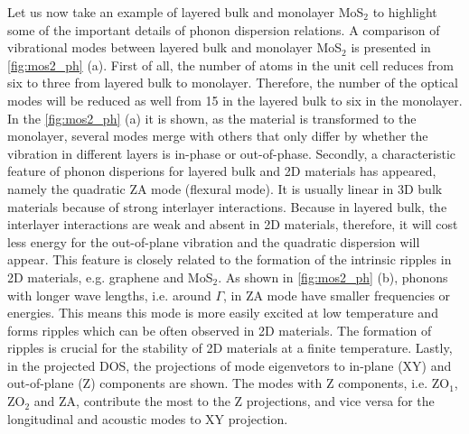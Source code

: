 Let us now take an example of layered bulk and monolayer MoS$_2$ to highlight some of the important details of phonon dispersion relations. A comparison of vibrational modes between layered bulk and monolayer MoS$_2$ is presented in \autoref{fig:mos2_ph} (a). First of all, the number of atoms in the unit cell reduces from six to three from layered bulk to monolayer. Therefore, the number of the optical modes will be reduced as well from 15 in the layered bulk to six in the monolayer. In the \autoref{fig:mos2_ph} (a) it is shown, as the material is transformed to the monolayer, several modes merge with others that only differ by whether the vibration in different layers is in-phase or out-of-phase. Secondly, a characteristic feature of phonon disperions for layered bulk and 2D materials has appeared, namely the quadratic ZA mode (flexural mode). It is usually linear in 3D bulk materials because of strong interlayer interactions. Because in layered bulk, the interlayer interactions are weak and absent in 2D materials, therefore, it will cost less energy for the out-of-plane vibration and the quadratic dispersion will appear\cite{kittel}. This feature is closely related to the formation of the intrinsic ripples in 2D materials, e.g. graphene\cite{neek} and MoS$_2$\cite{mos2-ripple}. As shown in \autoref{fig:mos2_ph} (b), phonons with longer wave lengths, i.e. around $\Gamma$, in ZA mode have smaller frequencies or energies. This means this mode is more easily excited at low temperature and forms ripples which can be often observed in 2D materials. The formation of ripples is crucial for the stability of 2D materials at a finite temperature. Lastly, in the projected DOS, the projections of mode eigenvetors to in-plane (XY) and out-of-plane (Z) components are shown. The modes with Z components, i.e. ZO$_1$, ZO$_2$ and ZA, contribute the most to the Z projections, and vice versa for the longitudinal and acoustic modes to XY projection. 

